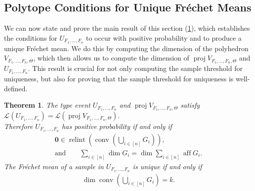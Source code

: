 \documentclass[10pt]{article}
\newtheorem{theorem}{Theorem}[section]
\theoremstyle{definition}
\theoremstyle{remark}
\renewcommand{\L}{\mathcal{L}}
\newcommand{\CType}{F_1,\dots,F_n}
\DeclareMathOperator{\conv}{conv}
\DeclareMathOperator{\relint}{relint}
\DeclareMathOperator{\aff}{aff}
\DeclareMathOperator{\proj}{proj}
\renewcommand{\vec}[1]{\mathbf{#1}}
\begin{document}
	\subsection{Polytope Conditions for Unique Fr\'echet Means}
	
	We can now state and prove the main result of this section (\cref{thm:wwp_dim_condition}), which establishes the conditions for $U_{\CType}$ to occur with positive probability and to produce a unique Fr\'echet mean. We do this by computing the dimension of the polyhedron $V_{\CType,\Theta}$, which then allows us to compute the dimension of $\proj V_{\CType,\Theta}$ and $U_{\CType}$. This result is crucial for not only computing the sample threshold for uniqueness, but also for proving that the sample threshold for uniqueness is well-defined.
	
	\begin{theorem}\label{thm:wwp_dim_condition}
		The type event $U_{\CType}$ and $\proj V_{\CType,\Theta}$ satisfy
		$
		\L_{}(U_{\CType}) = \L(\proj V_{\CType,\Theta}).
		$ \\
		Therefore $U_{\CType}$ has positive probability if and only if
		\begin{gather}
			\vec 0 \in \relint \left( \conv \left(\textstyle \bigcup_{i \in [n]} G_i \right) \right) \label{eq:wpp_cond_possible}, \\
			\text{and} \qquad \textstyle \sum_{i \in [n]} \dim G_i = \dim \textstyle \sum_{i \in [n]} \aff G_i. \label{eq:wpp_cond_probable}
		\end{gather}
		The Fr\'echet mean of a sample in $U_{\CType}$ is unique if and only if 
		\begin{align}\label{eq:wpp_cond_unique}
			\dim \conv \left( \textstyle \bigcup_{i \in [n]} G_i \right) = k.
		\end{align}
	\end{theorem}
	
\end{document}
